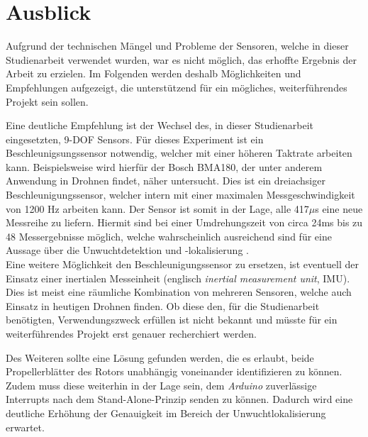 
\chapter{Ausblick}
Aufgrund der technischen Mängel und Probleme der Sensoren, welche in dieser Studienarbeit verwendet wurden, war es nicht möglich, das erhoffte Ergebnis der Arbeit zu erzielen.
Im Folgenden werden deshalb Möglichkeiten und Empfehlungen aufgezeigt, die unterstützend für ein mögliches, weiterführendes Projekt sein sollen.

Eine deutliche Empfehlung ist der Wechsel des, in dieser Studienarbeit eingesetzten, \ac{9-DOF} Sensors.
Für dieses Experiment ist ein Beschleunigsungssensor notwendig, welcher mit einer höheren Taktrate arbeiten kann.
Beispielsweise wird hierfür der Bosch BMA180, der unter anderem Anwendung in Drohnen findet, näher untersucht.
Dies ist ein dreiachsiger Beschleunigungssensor, welcher intern mit einer maximalen Messgeschwindigkeit von 1200 \ac{Hz} arbeiten kann.
Der Sensor ist somit in der Lage, alle 417$\mu$s eine neue Messreihe zu liefern.
Hiermit sind bei einer Umdrehungszeit von circa 24ms bis zu 48 Messergebnisse möglich, welche wahrscheinlich ausreichend sind für eine Aussage über die Unwuchtdetektion und -lokalisierung \cite{bosch_bma180}. \\
Eine weitere Möglichkeit den Beschleunigungssensor zu ersetzen, ist eventuell der Einsatz einer inertialen Messeinheit (englisch \textit{inertial measurement unit}, IMU).
Dies ist meist eine räumliche Kombination von mehreren Sensoren, welche auch Einsatz in heutigen Drohnen finden.
Ob diese den, für die Studienarbeit benötigten, Verwendungszweck erfüllen ist nicht bekannt und müsste für ein weiterführendes Projekt erst genauer recherchiert werden.

Des Weiteren sollte eine Lösung gefunden werden, die es erlaubt, beide Propellerblätter des Rotors unabhängig voneinander identifizieren zu können.
Zudem muss diese weiterhin in der Lage sein, dem \emph{Arduino} zuverlässige Interrupts nach dem Stand-Alone-Prinzip senden zu können.
Dadurch wird eine deutliche Erhöhung der Genauigkeit im Bereich der Unwuchtlokalisierung erwartet.

